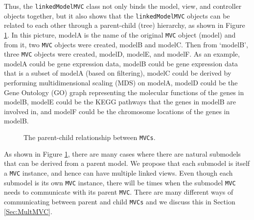 \documentclass{article}[11pt]
\newcommand{\Robject}[1]{{\texttt{#1}}}
\newcommand{\Rclass}[1]{\texttt{#1}}
\begin{document}
Thus, the \Rclass{linkedModelMVC} class not only binds the model,
view, and controller objects together, but it also shows
that the \Robject{linkedModelMVC} objects can be related to each other 
through a parent-child (tree) hierarchy, as shown in Figure \ref{Fig:Hier}.
In this picture, modelA is the name of the original \Robject{MVC} object
(model) and from it, two \Robject{MVC} objects were created,
modelB and modelC. Then from `modelB', three
\Robject{MVC} objects were created, modelD, modelE, and
modelF.  As an example, modelA could be gene 
expression data, modelB could be gene expression data that is a subset of
modelA (based on filtering), modelC could be derived by performing
multidimensional scaling (MDS) on modelA, modelD could be the Gene Ontology
(GO) graph representing the molecular functions of the genes in modelB,
modelE could be the KEGG pathways that the genes in modelB are involved
in, and modelF could be the chromosome locations of the genes in modelB.

\begin{figure}[ht]
  \begin{center}
    \caption{ The parent-child relationship between \Robject{MVCs}. }
    \label{Fig:Hier}
  \end{center}
\end{figure}

As shown in Figure \ref{Fig:Hier}, there are many cases where there are
natural submodels that can be derived from a parent model.  We propose that
each submodel is itself a \Robject{MVC} instance, and hence can have multiple
linked views.  Even though each submodel is its own \Robject{MVC} instance,
there will be times when the submodel \Robject{MVC} needs to communicate with
its parent \Robject{MVC}.  There are many different ways of communicating
between parent and child \Robject{MVCs} and we discuss this in Section
\ref{Sec:MultMVC}.
\end{document}
